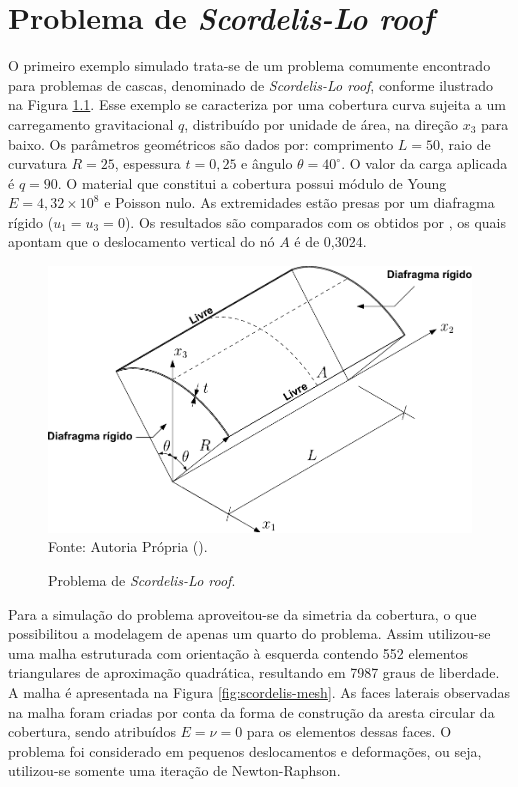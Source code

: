 \chapter[APÊNDICE \ref{Ap:SLR}]{Problema de \textit{Scordelis-Lo roof}}
\label{Ap:SLR}

O primeiro exemplo simulado trata-se de um problema comumente encontrado para problemas de cascas, denominado de \textit{Scordelis-Lo roof}, conforme ilustrado na Figura \ref{fig:scordelis}. Esse exemplo se caracteriza por uma cobertura curva sujeita a um carregamento gravitacional $q$, distribuído por unidade de área, na direção $x_3$ para baixo. Os parâmetros geométricos são dados por: comprimento $L=50$, raio de curvatura $R=25$, espessura $t=0,25$ e ângulo $\theta=40^\circ$. O valor da carga aplicada é $q=90$. O material que constitui a cobertura possui módulo de Young $E=4,32\times10^8$ e Poisson nulo. As extremidades estão presas por um diafragma rígido ($u_1=u_3=0$). Os resultados são comparados com os obtidos por , os quais apontam que o deslocamento vertical do nó $A$ é de 0,3024.

\begin{figure}[h!]
    \centering
    \caption{Problema de \textit{Scordelis-Lo roof}.}
    \includegraphics[width=0.75\linewidth]{Figuras/scordelis/scordelis_lo.pdf}
    \\Fonte: Autoria Própria (\the\year).
    \label{fig:scordelis}
\end{figure}

Para a simulação do problema aproveitou-se da simetria da cobertura, o que possibilitou a modelagem de apenas um quarto do problema. Assim utilizou-se uma malha estruturada com orientação à esquerda contendo 552 elementos triangulares de aproximação quadrática, resultando em 7987 graus de liberdade. A malha é apresentada na Figura \ref{fig:scordelis-mesh}. As faces laterais observadas na malha foram criadas por conta da forma de construção da aresta circular da cobertura, sendo atribuídos $E=\nu=0$ para os elementos dessas faces. O problema foi considerado em pequenos deslocamentos e deformações, ou seja, utilizou-se somente uma iteração de Newton-Raphson.

